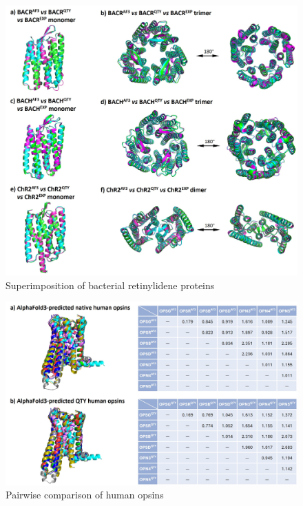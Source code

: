 \documentclass[fleqn,10pt,lineno]{manuscript}
\begin{document}
\begin{figure}[h]
	\centering
	\includegraphics[width=\linewidth]{figures/superimposition-bacterial.jpg}
	\caption{Superimposition of bacterial retinylidene proteins}
	\label{fig:bacterialsup}
\end{figure}

\begin{figure}[h]
	\centering
	\includegraphics[width=\linewidth]{figures/pairwise.jpg}
	\caption{Pairwise comparison of human opsins}
	\label{fig:pairwise}
\end{figure}
\end{document}
